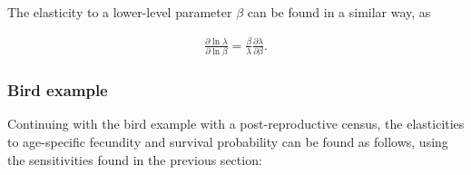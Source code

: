 \documentclass[
]{book}
\newenvironment{Shaded}{\begin{snugshade}}{\end{snugshade}}
\newcommand{\AttributeTok}[1]{\textcolor[rgb]{0.77,0.63,0.00}{#1}}
\newcommand{\ControlFlowTok}[1]{\textcolor[rgb]{0.13,0.29,0.53}{\textbf{#1}}}
\newcommand{\DecValTok}[1]{\textcolor[rgb]{0.00,0.00,0.81}{#1}}
\newcommand{\FunctionTok}[1]{\textcolor[rgb]{0.00,0.00,0.00}{#1}}
\newcommand{\NormalTok}[1]{#1}
\newcommand{\OtherTok}[1]{\textcolor[rgb]{0.56,0.35,0.01}{#1}}
\newcommand{\SpecialCharTok}[1]{\textcolor[rgb]{0.00,0.00,0.00}{#1}}
\begin{document}
\begin{Shaded}
\end{Shaded}

The elasticity to a lower-level parameter \(\beta\) can be found in a similar way, as

\begin{align} 
\frac{\partial  \ln \lambda}{\partial \ln \beta} =\frac{\beta}{\lambda}\frac{\partial  \lambda}{\partial \beta}.
\end{align}

\hypertarget{bird-example-13}{%
\subsubsection*{Bird example}\label{bird-example-13}}

Continuing with the bird example with a post-reproductive census, the elasticities to age-specific fecundity and survival probability can be found as follows, using the sensitivities found in the previous section:
\end{document}
